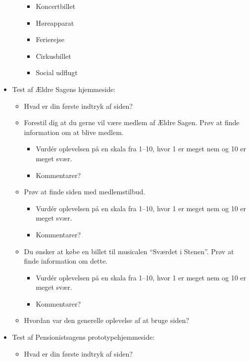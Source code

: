\begin{appendices}
\begin{itemize}
\begin{itemize}
        \begin{itemize}
            \item Koncertbillet
            \item Høreapparat
            \item Ferierejse
            \item Cirkusbillet
            \item Social udflugt
        \end{itemize}
    \end{itemize}
    \item Test af Ældre Sagens hjemmeside:
    \begin{itemize}
        \item Hvad er din første indtryk af siden?
        \item Forestil dig at du gerne vil være medlem af Ældre Sagen. Prøv at finde information om at blive medlem.
        \begin{itemize}
            \item Vurdér oplevelsen på en skala fra 1--10, hvor 1 er meget nem og 10 er meget svær.
            \item Kommentarer?
        \end{itemize}
        \item Prøv at finde siden med medlemstilbud.
        \begin{itemize}
            \item Vurdér oplevelsen på en skala fra 1--10, hvor 1 er meget nem og 10 er meget svær.
            \item Kommentarer?
        \end{itemize}
        \item Du ønsker at købe en billet til musicalen ``Sværdet i Stenen''. Prøv at finde information om dette.
        \begin{itemize}
            \item Vurdér oplevelsen på en skala fra 1--10, hvor 1 er meget nem og 10 er meget svær.
            \item Kommentarer?
        \end{itemize}
        \item Hvordan var den generelle oplevelse af at bruge siden?
    \end{itemize}
    \item Test af Pensionistsagens prototypehjemmeside:
    \begin{itemize}
        \item Hvad er din første indtryk af siden?

\end{itemize}
\end{itemize}
\end{appendices}
